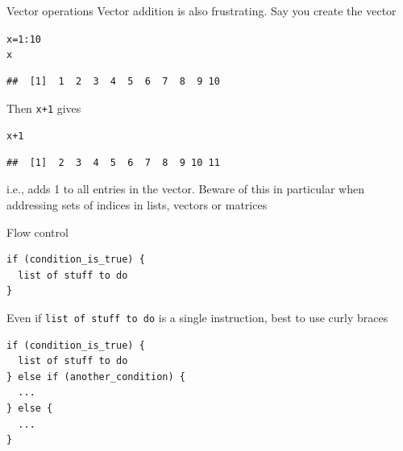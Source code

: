 \documentclass[aspectratio=169]{beamer}\usepackage[]{graphicx}\usepackage[]{xcolor}
\makeatletter
\newcommand{\hlnum}[1]{\textcolor[rgb]{0.686,0.059,0.569}{#1}}%
\newcommand{\hlopt}[1]{\textcolor[rgb]{0,0,0}{#1}}%
\newcommand{\hldef}[1]{\textcolor[rgb]{0.345,0.345,0.345}{#1}}%
\newcommand{\hlkwb}[1]{\textcolor[rgb]{0.69,0.353,0.396}{#1}}%
\newenvironment{kframe}{%
 \def\at@end@of@kframe{}%
 \ifinner\ifhmode%
  \def\at@end@of@kframe{\end{minipage}}%
  \begin{minipage}{\columnwidth}%
 \fi\fi%
 \def\FrameCommand##1{\hskip\@totalleftmargin \hskip-\fboxsep
 \colorbox{shadecolor}{##1}\hskip-\fboxsep
     \hskip-\linewidth \hskip-\@totalleftmargin \hskip\columnwidth}%
 \MakeFramed {\advance\hsize-\width
   \@totalleftmargin\z@ \linewidth\hsize
   \@setminipage}}%
 {\par\unskip\endMakeFramed%
 \at@end@of@kframe}
\newenvironment{knitrout}{}{} %
\makeatother
\begin{document}
\begin{frame}[fragile]{Vector operations}
Vector addition is also frustrating. Say you create the vector
\begin{knitrout}
\color{fgcolor}\begin{kframe}
\begin{alltt}
\hldef{x} \hlkwb{=} \hlnum{1}\hlopt{:}\hlnum{10}
\hldef{x}
\end{alltt}
\begin{verbatim}
##  [1]  1  2  3  4  5  6  7  8  9 10
\end{verbatim}
\end{kframe}
\end{knitrout}

Then \texttt{x+1} gives
\begin{knitrout}
\color{fgcolor}\begin{kframe}
\begin{alltt}
\hldef{x}\hlopt{+}\hlnum{1}
\end{alltt}
\begin{verbatim}
##  [1]  2  3  4  5  6  7  8  9 10 11
\end{verbatim}
\end{kframe}
\end{knitrout}

i.e., adds 1 to all entries in the vector.
Beware of this in particular when addressing sets of indices in lists, vectors or matrices
\end{frame}

\begin{frame}[fragile]{Flow control}
\begin{knitrout}
\color{fgcolor}\begin{kframe}
\begin{verbatim}
if (condition_is_true) {
  list of stuff to do
}
\end{verbatim}
\end{kframe}
\end{knitrout}

Even if \texttt{list of stuff to do} is a single instruction, best to use curly braces

\begin{knitrout}
\color{fgcolor}\begin{kframe}
\begin{verbatim}
if (condition_is_true) {
  list of stuff to do
} else if (another_condition) {
  ...
} else {
  ...
}
\end{verbatim}
\end{kframe}
\end{knitrout}
\end{frame}
\end{document}
